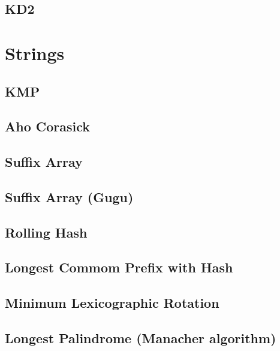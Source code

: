 \subsection{KD2}
\raggedbottom
\hrulefill

\section{Strings}
\subsection{KMP}
\raggedbottom
\hrulefill
\subsection{Aho Corasick}
\raggedbottom
\hrulefill
\subsection{Suffix Array}
\raggedbottom
\hrulefill
\subsection{Suffix Array (Gugu)}
\raggedbottom
\hrulefill
\subsection{Rolling Hash}
\raggedbottom
\hrulefill
\subsection{Longest Commom Prefix with Hash}
\raggedbottom
\hrulefill
\subsection{Minimum Lexicographic Rotation}
\raggedbottom
\hrulefill
\subsection{Longest Palindrome (Manacher algorithm)}
\raggedbottom
\hrulefill

